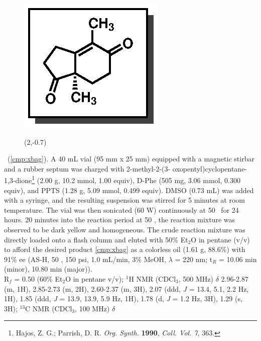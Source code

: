 \begin{figure}
  \vspace{-15pt}
  \begin{center}
    \includegraphics[scale=0.8]{chp_singlecarbon/images/xbag}
    \begin{textblock}{1}(2,-0.7)  \end{textblock}
  \end{center}
  \vspace{-30pt}
\end{figure}\noindent \textbf{\CMPxbag}\ (\ref{cmp:xbag}). A 40 mL vial (95 mm x 25 mm) equipped
with a magnetic stirbar and a rubber septum was charged with 2-methyl-2-(3-
oxopentyl)cyclopentane-1,3-dione\footnote{{\frenchspacing Hajos, Z. G.; Parrish, D. R.	
  \textit{Org. Synth.} \textbf{1990},	\textit{Coll. Vol. 7}, 363.}} (2.00 g, 10.2 mmol, 1.00 equiv),
  D-Phe (505 mg, 3.06 mmol, 0.300 equiv), and PPTS (1.28 g, 5.09 mmol, 0.499 equiv). DMSO
(0.73 mL) was added with a syringe, and the resulting suspension was stirred for 5 minutes at
room temperature. The vial was then sonicated (60 W) continuously at 50 \degc\  for 24 hours. 20
minutes into the reaction period at 50 \degc, the reaction mixture was observed to be dark yellow
and homogeneous. The crude reaction mixture was directly loaded onto a flash column and eluted
with 50\% Et$_2$O in pentane (v/v) to afford the desired product \ref{cmp:xbag} as a colorless oil
(1.61 g, 88.6\%) with 91\% ee (AS-H, 50 \degc, 150 psi, 1.0 mL/min, 3\% MeOH, $\lambda$ = 220 nm;
t$_R$ = 10.06 min (minor), 10.80 min (major)). \\
R$_f$ = 0.50 (60\% Et$_2$O in pentane v/v); $^1$H NMR (CDCl$_3$, 500 MHz) $\delta$ 2.96-2.87 (m,
1H), 2.85-2.73 (m, 2H), 2.60-2.37 (m, 3H), 2.07 (ddd, \textit{J} = 13.4, 5.1, 2.2 Hz, 1H), 1.85 (ddd, \textit{J} = 13.9, 13.9, 5.9 Hz,
1H), 1.78 (d, \textit{J} = 1.2 Hz, 3H), 1.29 (s, 3H); $^{13}$C NMR (CDCl$_3$, 100 MHz) $\delta$
